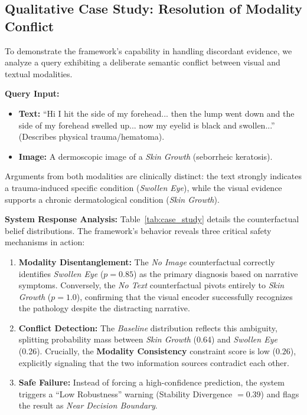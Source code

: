 
\subsection{Qualitative Case Study: Resolution of Modality Conflict}
\label{subsec:case_study}
To demonstrate the framework's capability in handling discordant evidence, we analyze a query exhibiting a deliberate semantic conflict between visual and textual modalities.

\textbf{Query Input:}
\begin{itemize}
    \item \textbf{Text:} ``Hi I hit the side of my forehead... then the lump went down and the side of my forehead swelled up... now my eyelid is black and swollen...'' (Describes physical trauma/hematoma).
    \item \textbf{Image:} A dermoscopic image of a \textit{Skin Growth} (seborrheic keratosis).
\end{itemize}

Arguments from both modalities are clinically distinct: the text strongly indicates a trauma-induced specific condition (\textit{Swollen Eye}), while the visual evidence supports a chronic dermatological condition (\textit{Skin Growth}).

\textbf{System Response Analysis:}
Table~\ref{tab:case_study} details the counterfactual belief distributions. The framework's behavior reveals three critical safety mechanisms in action:

\begin{enumerate}
    \item \textbf{Modality Disentanglement:} The \textit{No Image} counterfactual correctly identifies \textit{Swollen Eye} ($p=0.85$) as the primary diagnosis based on narrative symptoms. Conversely, the \textit{No Text} counterfactual pivots entirely to \textit{Skin Growth} ($p=1.0$), confirming that the visual encoder successfully recognizes the pathology despite the distracting narrative.
    
    \item \textbf{Conflict Detection:} The \textit{Baseline} distribution reflects this ambiguity, splitting probability mass between \textit{Skin Growth} (0.64) and \textit{Swollen Eye} (0.26). Crucially, the \textbf{Modality Consistency} constraint score is low ($0.26$), explicitly signaling that the two information sources contradict each other.
    
    \item \textbf{Safe Failure:} Instead of forcing a high-confidence prediction, the system triggers a ``Low Robustness'' warning (Stability Divergence $= 0.39$) and flags the result as \textit{Near Decision Boundary}.
\end{enumerate}

